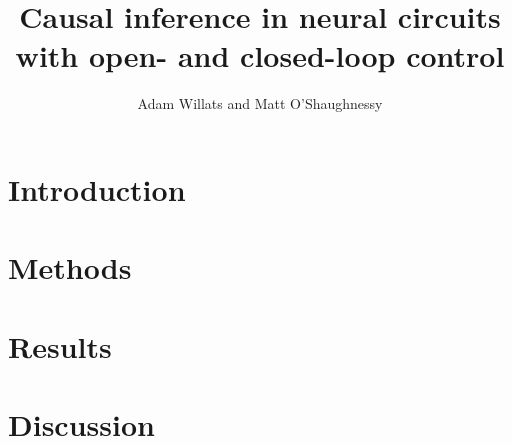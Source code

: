 \documentclass{article}
\title{Causal inference in neural circuits with open- and closed-loop control}
\author{Adam Willats and Matt O'Shaughnessy}
\begin{document}

\maketitle

\begin{abstract}
    
\end{abstract}

\section{Introduction}
\label{sec:introduction}


\section{Methods}
\label{sec:methods}


\section{Results}
\label{sec:results}





\section{Discussion}
\label{sec:discussion}






\end{document}
